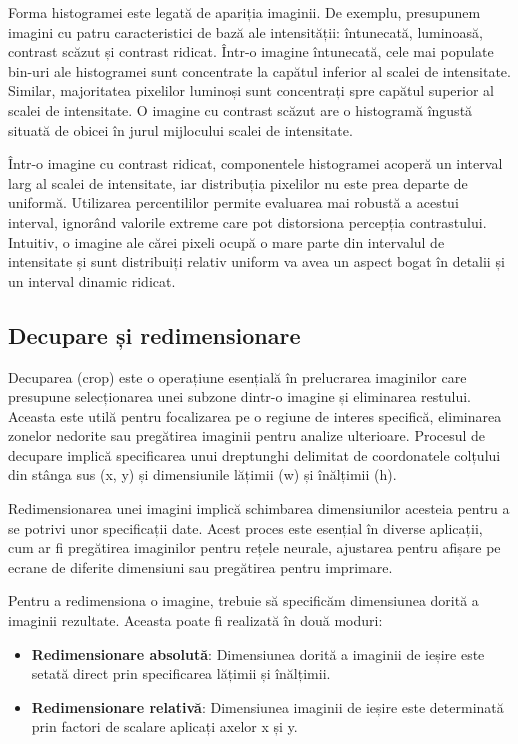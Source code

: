 Forma histogramei este legată de apariția imaginii. De exemplu, presupunem imagini cu patru caracteristici de bază ale intensității: întunecată, luminoasă, contrast scăzut și contrast ridicat. Într-o imagine întunecată, cele mai populate bin-uri ale histogramei sunt concentrate la capătul inferior al scalei de intensitate. Similar, majoritatea pixelilor luminoși sunt concentrați spre capătul superior al scalei de intensitate. O imagine cu contrast scăzut are o histogramă îngustă situată de obicei în jurul mijlocului scalei de intensitate.

Într-o imagine cu contrast ridicat, componentele histogramei acoperă un interval larg al scalei de intensitate, iar distribuția pixelilor nu este prea departe de uniformă. Utilizarea percentililor permite evaluarea mai robustă a acestui interval, ignorând valorile extreme care pot distorsiona percepția contrastului. Intuitiv, o imagine ale cărei pixeli ocupă o mare parte din intervalul de intensitate și sunt distribuiți relativ uniform va avea un aspect bogat în detalii și un interval dinamic ridicat.

\subsection*{Decupare și redimensionare}

Decuparea (crop) este o operațiune esențială în prelucrarea imaginilor care presupune selecționarea unei subzone dintr-o imagine și eliminarea restului. Aceasta este utilă pentru focalizarea pe o regiune de interes specifică, eliminarea zonelor nedorite sau pregătirea imaginii pentru analize ulterioare. Procesul de decupare implică specificarea unui dreptunghi delimitat de coordonatele colțului din stânga sus (x, y) și dimensiunile lățimii (w) și înălțimii (h).

Redimensionarea unei imagini implică schimbarea dimensiunilor acesteia pentru a se potrivi unor specificații date. Acest proces este esențial în diverse aplicații, cum ar fi pregătirea imaginilor pentru rețele neurale, ajustarea pentru afișare pe ecrane de diferite dimensiuni sau pregătirea pentru imprimare.

Pentru a redimensiona o imagine, trebuie să specificăm dimensiunea dorită a imaginii rezultate. Aceasta poate fi realizată în două moduri:
\begin{itemize}
    \item \textbf{Redimensionare absolută}: Dimensiunea dorită a imaginii de ieșire este setată direct prin specificarea lățimii și înălțimii.
    \item \textbf{Redimensionare relativă}: Dimensiunea imaginii de ieșire este determinată prin factori de scalare aplicați axelor x și y.
\end{itemize}

